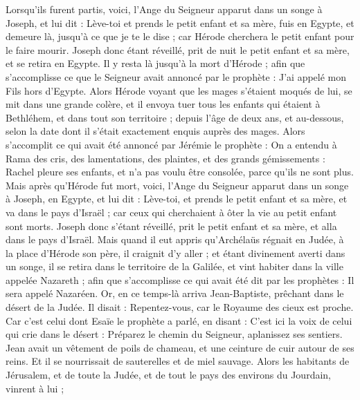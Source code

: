 \begin{multicols}{2}
Lorsqu'ils furent partis, voici, l'Ange du Seigneur apparut dans un songe à Joseph, et lui dit : Lève-toi et prends le petit enfant et sa mère, fuis en Egypte, et demeure là, jusqu'à ce que je te le dise ; car Hérode cherchera le petit enfant pour le faire mourir.
Joseph donc étant réveillé, prit de nuit le petit enfant et sa mère, et se retira en Egypte.
Il y resta là jusqu'à la mort d'Hérode ; afin que s'accomplisse ce que le Seigneur avait annoncé par le prophète : J'ai appelé mon Fils hors d'Egypte.
Alors Hérode voyant que les mages s'étaient moqués de lui, se mit dans une grande colère, et il envoya tuer tous les enfants qui étaient à Bethléhem, et dans tout son territoire ; depuis l'âge de deux ans, et au-dessous, selon la date dont il s'était exactement enquis auprès des mages.
Alors s'accomplit ce qui avait été annoncé par Jérémie le prophète :
On a entendu à Rama des cris, des lamentations, des plaintes, et des grands gémissements : Rachel pleure ses enfants, et n'a pas voulu être consolée, parce qu'ils ne sont plus.
Mais après qu'Hérode fut mort, voici, l'Ange du Seigneur apparut dans un songe à Joseph, en Egypte,
et lui dit : Lève-toi, et prends le petit enfant et sa mère, et va dans le pays d'Israël ; car ceux qui cherchaient à ôter la vie au petit enfant sont morts.
Joseph donc s'étant réveillé, prit le petit enfant et sa mère, et alla dans le pays d'Israël.
Mais quand il eut appris qu'Archélaüs régnait en Judée, à la place d'Hérode son père, il craignit d'y aller ; et étant divinement averti dans un songe, il se retira dans le territoire de la Galilée,
et vint habiter dans la ville appelée Nazareth ; afin que s'accomplisse ce qui avait été dit par les prophètes : Il sera appelé Nazaréen.
\VerseOne{}Or, en ce temps-là arriva Jean-Baptiste, prêchant dans le désert de la Judée.
Il disait : Repentez-vous, car le Royaume des cieux est proche.
Car c'est celui dont Esaïe le prophète a parlé, en disant : C'est ici la voix de celui qui crie dans le désert : Préparez le chemin du Seigneur, aplanissez ses sentiers.
Jean avait un vêtement de poils de chameau, et une ceinture de cuir autour de ses reins. Et il se nourrissait de sauterelles et de miel sauvage.
Alors les habitants de Jérusalem, et de toute la Judée, et de tout le pays des environs du Jourdain, vinrent à lui ;

\end{multicols}
